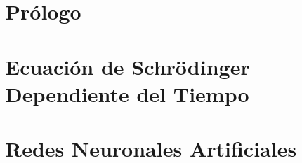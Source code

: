 \documentclass[openany,%
                headinclude,footinclude,abstract=on,
                BCOR=5mm,paper=a4,fontsize=12pt
                ]{scrreprt}
\begin{document}
\frenchspacing
\raggedbottom

\pagestyle{plain}

\nocite{*} %



%


\cleardoublepage
\cleardoublepage

\cleardoublepage

\pagestyle{scrheadings}
\part{Prólogo}\label{pt:Prologo}




\cleardoublepage
\part{Ecuación de Schrödinger Dependiente del Tiempo}\label{pt:TDSE}





\part{Redes Neuronales Artificiales}\label{pt:ANNS}



\end{document}
